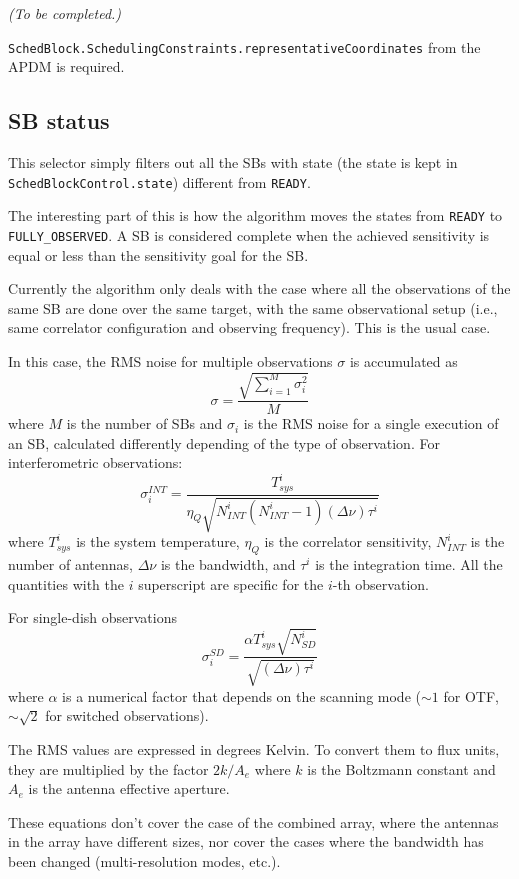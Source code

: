 \documentclass{article}
\begin{document}
{\em (To be completed.)}

{\tt SchedBlock.SchedulingConstraints.representativeCoordinates} from the APDM is required.

\subsection{SB status}

This selector simply filters out all the SBs with state (the state is
kept in {\tt SchedBlockControl.state}) different from {\tt READY}.

The interesting part of this is how the algorithm moves the states
from {\tt READY} to {\tt FULLY\_OBSERVED}. A SB is considered complete
when the achieved sensitivity is equal or less than the sensitivity
goal for the SB.

Currently the algorithm only deals with the case where all the observations
of the same SB are done over the same target, with the same observational
setup (i.e., same correlator configuration and observing frequency). This
is the usual case.

In this case, the RMS noise for multiple observations $\sigma$ is accumulated as
$$
\sigma = \frac{\sqrt{\sum_{i=1}^M \sigma_i^2}}{M}
$$
where $M$ is the number of SBs and $\sigma_i$ is the RMS noise for a single
execution of an SB, calculated differently depending of the type of observation.
For interferometric observations:
$$
\sigma_i^{INT} = \frac{T_{sys}^i}{\eta_Q \sqrt{N_{INT}^i(N_{INT}^i-1)(\Delta\nu)\tau^i}}
$$
where $T_{sys}^i$ is the system temperature, $\eta_Q$ is the correlator sensitivity,
$N_{INT}^i$ is the number of antennas, $\Delta\nu$ is the bandwidth, and $\tau^i$ is
the integration time. All the quantities with the $i$ superscript are specific for the $i$-th
observation.

For single-dish observations
$$
\sigma_i^{SD} = \frac{\alpha T_{sys}^i \sqrt{N_{SD}^i}}{\sqrt{(\Delta\nu)\tau^i}}
$$
where $\alpha$ is a numerical factor that depends on the scanning mode ($\sim 1$ for OTF,
$\sim \sqrt{2}$ for switched observations).

The RMS values are expressed in degrees Kelvin. To convert them to flux units, they are
multiplied by the factor $2k/A_e$ where $k$ is the Boltzmann constant and $A_e$ is the
antenna effective aperture.

These equations don't cover the case of the combined array, where the antennas in the
array have different sizes, nor cover the cases where the bandwidth has been changed
(multi-resolution modes, etc.).
\end{document}

